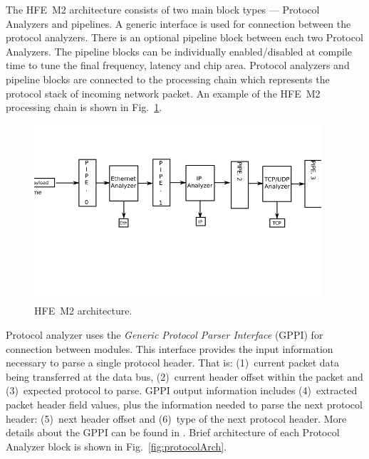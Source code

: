 The HFE~M2 architecture consists of two main block types --- Protocol Analyzers and pipelines. 
A generic interface is used for connection between the protocol
analyzers. There is an optional pipeline block between each two Protocol Analyzers.
The pipeline blocks can be individually enabled/disabled at compile time to tune the final frequency, latency and chip area.
Protocol analyzers and pipeline blocks are connected to the processing chain which represents the protocol stack of incoming 
network packet. 
An example of the HFE~M2 processing chain is shown in Fig.~\ref{fig:hfem2Arch}.

\begin{figure}[ht]
    \centering
    \includegraphics[width=0.95\textwidth]{chapters/pic/ParserTop}
    \caption{HFE~M2 architecture.}
    \label{fig:hfem2Arch}
\end{figure}  

Protocol analyzer uses the \textit{Generic Protocol Parser Interface} (GPPI) for connection between modules. This interface
provides the input information necessary to parse a single protocol header. That is: (1)~current packet data being
transferred at the data bus, (2)~current header offset within the packet and (3)~expected protocol to parse. 
GPPI output information includes (4)~extracted packet header field values, plus the information needed to 
parse the next protocol header: (5)~next header offset
and (6)~type of the next protocol header. More details about the GPPI can be found in \cite{hfem2}.
Brief architecture of each Protocol Analyzer block is shown in Fig.~\ref{fig:protocolArch}. 

